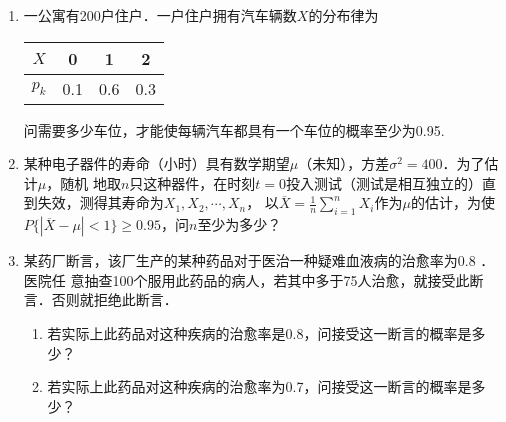 \documentclass[10pt,a4paper]{article}
\begin{document}
\begin{enumerate}
    \item 一公寓有200户住户．一户住户拥有汽车辆数$X$的分布律为
    \begin{table}[H]\centering
    \begin{tabular}{c|ccc}
    $X$   & 0 & 1   & 2   \\ \hline
    $p_k$ & 0.1  & 0.6 & 0.3
    \end{tabular}
    \end{table}
    \vspace{-0.5cm}
    问需要多少车位，才能使每辆汽车都具有一个车位的概率至少为0.95.


    \item 某种电子器件的寿命（小时）具有数学期望$\mu$（未知），方差$\sigma^2=400$．为了估计$\mu$，随机
    地取$n$只这种器件，在时刻$t=0$投入测试（测试是相互独立的）直到失效，测得其寿命为$X_1,X_2,\cdots,X_n$，
    以$\displaystyle{\overline{X}=\frac{1}{n}\sum_{i=1}^n X_i}$作为$\mu$的估计，为使
    $P\{|\overline{X}-\mu|<1\}\geq 0.95$，问$n$至少为多少？

    \item 某药厂断言，该厂生产的某种药品对于医治一种疑难血液病的治愈率为0.8 ．医院任
    意抽查100个服用此药品的病人，若其中多于75人治愈，就接受此断言．否则就拒绝此断言．
    \begin{enumerate}
        \item 若实际上此药品对这种疾病的治愈率是0.8，问接受这一断言的概率是多少？
        \item 若实际上此药品对这种疾病的治愈率为0.7，问接受这一断言的概率是多少？
    \end{enumerate}

    

    


  

\end{enumerate}
\end{document}
